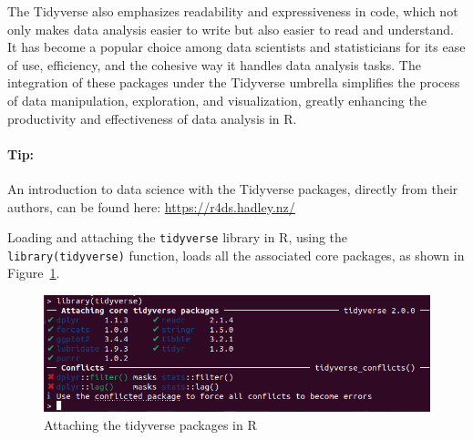 The Tidyverse also emphasizes readability and expressiveness in code, which not only makes data analysis easier to write but also easier to read and understand. It has become a popular choice among data scientists and statisticians for its ease of use, efficiency, and the cohesive way it handles data analysis tasks. The integration of these packages under the Tidyverse umbrella simplifies the process of data manipulation, exploration, and visualization, greatly enhancing the productivity and effectiveness of data analysis in R.

\begin{tcolorbox}[colback=code]
\paragraph{Tip:} An introduction to data science with the Tidyverse packages, directly from their authors, can be found here: \url{https://r4ds.hadley.nz/}
\end{tcolorbox}

Loading and attaching the \texttt{tidyverse} library in R, using the \texttt{library(tidyverse)} function, loads all the associated core packages, as shown in Figure~\ref{fig:tidyverse}.

\begin{figure}
\centering
\includegraphics[width=\textwidth]{screen2.png}
\caption{Attaching the tidyverse packages in R}
\label{fig:tidyverse}
\end{figure}


